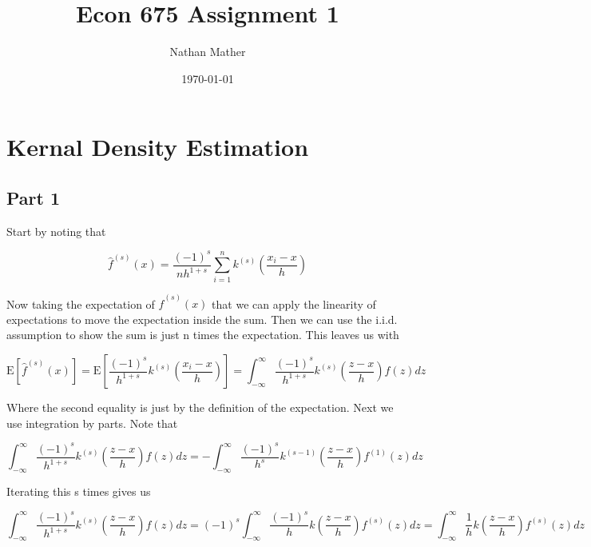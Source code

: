 \documentclass[11pt]{article}
\title{Econ 675 Assignment 1} %
\author{Nathan Mather} %
\date{\today} %
\newcommand{\E}{\mathrm{E}}
\begin{document}
	
\maketitle %

\setcounter{tocdepth}{2} %

\tableofcontents %


\section{Kernal Density Estimation}
\subsection{Part 1}

Start by noting that 

$$ \hat{f}^{(s)}(x) = \frac{(-1)^s}{nh^{1+s}} \sum_{i=1}^{n}k^{(s)} \left( \frac{{x}_i - x}{h} \right) 
$$

Now taking the expectation of $\hat{f}^{(s)}(x)$ that we can apply the linearity of expectations to move the expectation inside the sum. Then we can use the i.i.d. assumption to show the sum is just n times the expectation. This leaves us with 

$$  \E[\hat{f}^{(s)}(x)] = \E \left[ \frac{(-1)^s}{h^{1+s}} k^{(s)} \left( \frac{{x}_i - x}{h} \right)  \right]
= \int_{-\infty}^{\infty} \frac{(-1)^s}{h^{1+s}} k^{(s)} \left( \frac{z - x}{h} \right)f(z)dz
$$



Where the second equality is just by the definition of the expectation. Next we use integration by parts. Note that 

$$\int_{-\infty}^{\infty} \frac{(-1)^s}{h^{1+s}} k^{(s)} \left( \frac{z - x}{h} \right)f(z)dz = -\int_{-\infty}^{\infty} \frac{(-1)^s}{h^{s}} k^{(s-1)} \left( \frac{z - x}{h} \right)f^{(1)}(z)dz
$$

Iterating this s times gives us

$$\int_{-\infty}^{\infty} \frac{(-1)^s}{h^{1+s}} k^{(s)} \left( \frac{z - x}{h} \right)f(z)dz
=  (-1)^s \int_{-\infty}^{\infty} \frac{(-1)^s}{h} k \left( \frac{z - x}{h} \right)f^{(s)}(z)dz
= \int_{-\infty}^{\infty} \frac{1}{h} k \left( \frac{z - x}{h} \right)f^{(s)}(z)dz
$$
\end{document}

